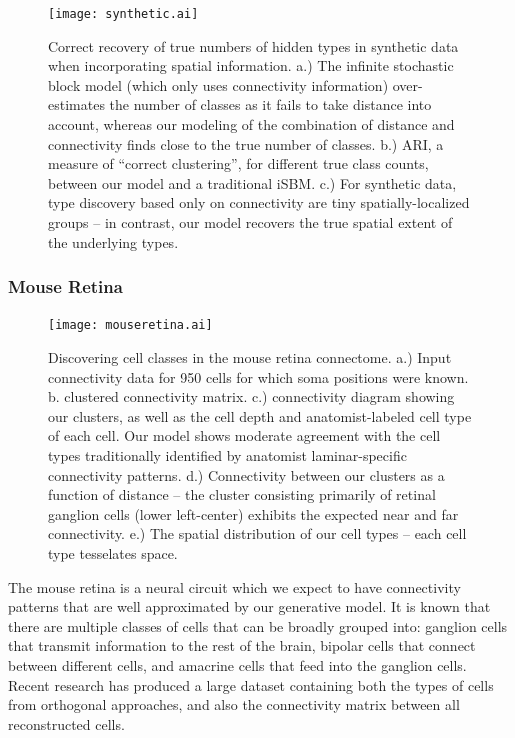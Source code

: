 \documentclass{article}
\begin{document}
\begin{figure}
  \centering 
  \centerline{\texttt{[image: synthetic.ai]}}
  \caption{Correct recovery of true numbers of hidden types in
    synthetic data when incorporating spatial information. a.) The
    infinite stochastic block model (which only uses connectivity
    information) over-estimates the number of classes as it fails to
    take distance into account, whereas our modeling of the
    combination of distance and connectivity finds close to the true
    number of classes. b.) ARI, a measure of ``correct clustering'',
    for different true class counts, between our model and a
    traditional iSBM. c.) For synthetic data, type discovery based
    only on connectivity are tiny spatially-localized groups -- in
    contrast, our model recovers the true spatial extent of the
    underlying types.  }
\label{fig:synthetic}
\end{figure}

\subsubsection{Mouse Retina}

\begin{figure}
  \centering 
  \centerline{\texttt{[image: mouseretina.ai]}}
  \caption{Discovering cell classes in the mouse retina connectome.
    a.) Input connectivity data for 950 cells for which soma positions
    were known. b. clustered connectivity matrix. c.) connectivity
    diagram showing our clusters, as well as the cell depth and
    anatomist-labeled cell type of each cell. Our model shows moderate
    agreement with the cell types traditionally identified by
    anatomist laminar-specific connectivity patterns. 
    d.) Connectivity between our clusters as a function
    of distance -- the cluster consisting primarily of retinal
    ganglion cells (lower left-center) exhibits the expected near and
    far connectivity. e.)  The spatial distribution of our cell types
    -- each cell type tesselates space.}
\label{fig:mouseretina}
\end{figure}

The mouse retina \autocite{Masland2001} is a neural circuit which we
expect to have connectivity patterns that are well approximated by our
generative model. It is known that there are multiple classes of cells
that can be broadly grouped into: ganglion cells that transmit
information to the rest of the brain, bipolar cells that connect
between different cells, and amacrine cells that feed into the
ganglion cells. Recent research \autocite{Helmstaedter2013} has
produced a large dataset containing both the types of cells from
orthogonal approaches, and also the connectivity matrix between all
reconstructed cells.
\end{document}
